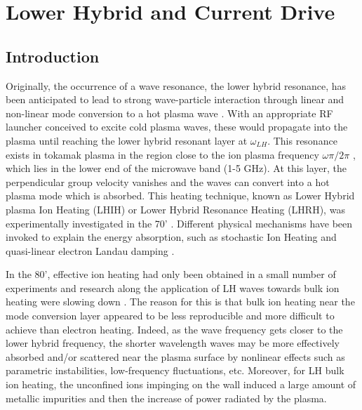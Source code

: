 \chapter{Lower Hybrid and Current Drive}


\section{Introduction}
Originally, the occurrence of a wave resonance, the lower hybrid resonance, has been anticipated to lead to strong wave-particle interaction through linear and non-linear mode conversion to a hot plasma wave \cite{Stix1992}. With an appropriate RF launcher conceived to excite cold plasma waves, these would propagate into the plasma until reaching the lower hybrid resonant layer at $\omega_{LH}$. This resonance exists in tokamak plasma in the region close to the ion plasma frequency $\omega \pi/2\pi$ , which lies in the lower end of the microwave band (1-5 GHz). At this layer, the perpendicular group velocity vanishes and the waves can convert into a hot plasma mode which is absorbed. This heating technique, known as Lower Hybrid plasma Ion Heating (LHIH) or Lower Hybrid Resonance Heating (LHRH), was experimentally investigated in the 70' \cite{Bellan1974, Hooke1972, Golant1972, Tonon1977, Schuss1981}. Different physical mechanisms have been invoked to explain the energy absorption, such as stochastic Ion Heating\cite{Karney1977,Karney1978b,Karney1979b} and quasi-linear electron Landau damping \cite{Brambilla1983, Fisch1978, Karney1979}.

In the 80', effective ion heating had only been obtained in a small number of experiments and research along the application of LH waves towards bulk ion heating were slowing down \cite{Gormezano1986, Porkolab1984a, Tonon1984}. The reason for this is that bulk ion heating near the mode conversion layer appeared to be less reproducible and more difficult to achieve than electron heating. Indeed, as the wave frequency gets closer to the lower hybrid frequency, the shorter wavelength waves may be more effectively absorbed and/or scattered near the plasma surface by nonlinear effects such as parametric instabilities, low-frequency fluctuations, etc. Moreover, for LH bulk ion heating, the unconfined ions impinging on the wall induced a large amount of metallic impurities and then the increase of power radiated by the plasma.

